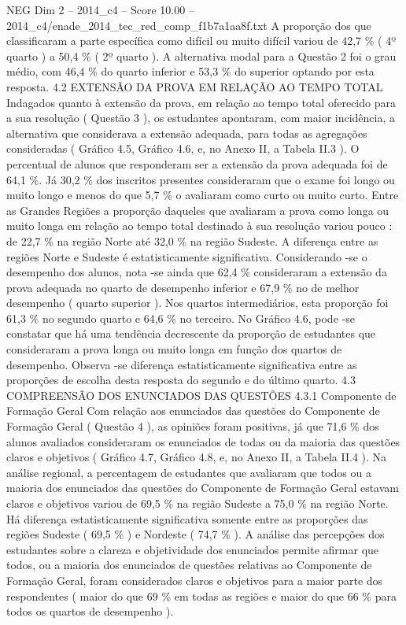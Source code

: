 \begin{textsample}{NEG Dim 2 – 2014\_c4 – Score 10.00 – 2014\_c4/enade\_2014\_tec\_red\_comp\_f1b7a1aa8f.txt}
A proporção dos que classificaram a parte específica como difícil ou muito difícil variou de 42,7 \% ( 4º quarto ) a 50,4 \% ( 2º quarto ).
A alternativa modal para a Questão 2 foi o grau médio, com 46,4 \% do quarto inferior e 53,3 \% do superior optando por esta resposta. 4.2 EXTENSÃO DA PROVA EM RELAÇÃO AO TEMPO TOTAL Indagados quanto à extensão da prova, em relação ao tempo total oferecido para a sua resolução ( Questão 3 ), os estudantes apontaram, com maior incidência, a alternativa que considerava a extensão adequada, para todas as agregações consideradas ( Gráfico 4.5, Gráfico 4.6, e, no Anexo II, a Tabela II.3 ).
O percentual de alunos que responderam ser a extensão da prova adequada foi de 64,1 \%.
Já 30,2 \% dos inscritos presentes consideraram que o exame foi longo ou muito longo e menos do que 5,7 \% o avaliaram como curto ou muito curto.
Entre as Grandes Regiões a proporção daqueles que avaliaram a prova como longa ou muito longa em relação ao tempo total destinado à sua resolução variou pouco : de 22,7 \% na região Norte até 32,0 \% na região Sudeste.
A diferença entre as regiões Norte e Sudeste é estatisticamente significativa.
Considerando -se o desempenho dos alunos, nota -se ainda que 62,4 \% consideraram a extensão da prova adequada no quarto de desempenho inferior e 67,9 \% no de melhor desempenho ( quarto superior ).
Nos quartos intermediários, esta proporção foi 61,3 \% no segundo quarto e 64,6 \% no terceiro.
No Gráfico 4.6, pode -se constatar que há uma tendência decrescente da proporção de estudantes que consideraram a prova longa ou muito longa em função dos quartos de desempenho.
Observa -se diferença estatisticamente significativa entre as proporções de escolha desta resposta do segundo e do último quarto. 4.3 COMPREENSÃO DOS ENUNCIADOS DAS QUESTÕES 4.3.1 Componente de Formação Geral Com relação aos enunciados das questões do Componente de Formação Geral ( Questão 4 ), as opiniões foram positivas, já que 71,6 \% dos alunos avaliados consideraram os enunciados de todas ou da maioria das questões claros e objetivos ( Gráfico 4.7, Gráfico 4.8, e, no Anexo II, a Tabela II.4 ).
Na análise regional, a percentagem de estudantes que avaliaram que todos ou a maioria dos enunciados das questões do Componente de Formação Geral estavam claros e objetivos variou de 69,5 \% na região Sudeste a 75,0 \% na região Norte.
Há diferença estatisticamente significativa somente entre as proporções das regiões Sudeste ( 69,5 \% ) e Nordeste ( 74,7 \% ).
A análise das percepções dos estudantes sobre a clareza e objetividade dos enunciados permite afirmar que todos, ou a maioria dos enunciados de questões relativas ao Componente de Formação Geral, foram considerados claros e objetivos para a maior parte dos respondentes ( maior do que 69 \% em todas as regiões e maior do que 66 \% para todos os quartos de desempenho ).

\end{textsample}
